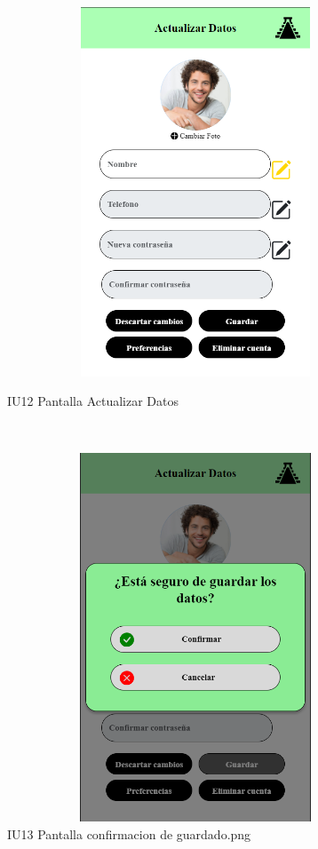\begin{figure}[htb]
        \begin{minipage}{1\textwidth}
        \centering
        \includegraphics[width=17cm, height=11cm]{front/PANTALLAS FUNCIONALES 3 DICIEMBRE/IU12_Pantalla Actualizar Datos.png}
        \caption{IU12 Pantalla Actualizar Datos}
    \end{minipage}%
    \\
        \begin{minipage}{1\textwidth}
        \centering
        \includegraphics[width=17cm, height=11cm]{front/PANTALLAS FUNCIONALES 3 DICIEMBRE/IU13_Pantalla confirmacion de guardado.png}
        \caption{IU13 Pantalla confirmacion de guardado.png}
    \end{minipage}%
\end{figure}

